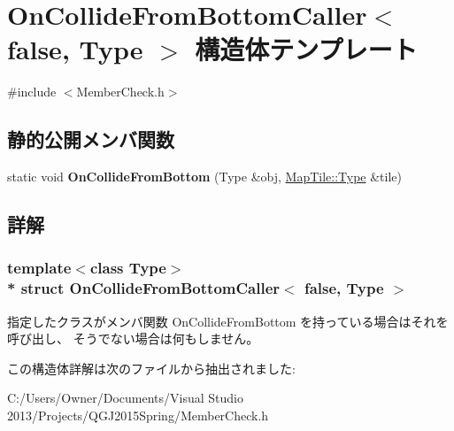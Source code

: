 \hypertarget{struct_on_collide_from_bottom_caller_3_01false_00_01_type_01_4}{}\section{On\+Collide\+From\+Bottom\+Caller$<$ false, Type $>$ 構造体テンプレート}
\label{struct_on_collide_from_bottom_caller_3_01false_00_01_type_01_4}


 




{\ttfamily \#include $<$Member\+Check.\+h$>$}

\subsection*{静的公開メンバ関数}
\begin{DoxyCompactItemize}
\item 
static void {\bfseries On\+Collide\+From\+Bottom} (Type \&obj, \hyperlink{struct_my_map_tile}{Map\+Tile\+::\+Type} \&tile)\hypertarget{struct_on_collide_from_bottom_caller_3_01false_00_01_type_01_4_ab793ab28840673489d998da907ee274b}{}\label{struct_on_collide_from_bottom_caller_3_01false_00_01_type_01_4_ab793ab28840673489d998da907ee274b}

\end{DoxyCompactItemize}


\subsection{詳解}
\subsubsection*{template$<$class Type$>$\\*
struct On\+Collide\+From\+Bottom\+Caller$<$ false, Type $>$}



指定したクラスがメンバ関数 On\+Collide\+From\+Bottom を持っている場合はそれを呼び出し、 そうでない場合は何もしません。 

この構造体詳解は次のファイルから抽出されました\+:\begin{DoxyCompactItemize}
\item 
C\+:/\+Users/\+Owner/\+Documents/\+Visual Studio 2013/\+Projects/\+Q\+G\+J2015\+Spring/Member\+Check.\+h\end{DoxyCompactItemize}
